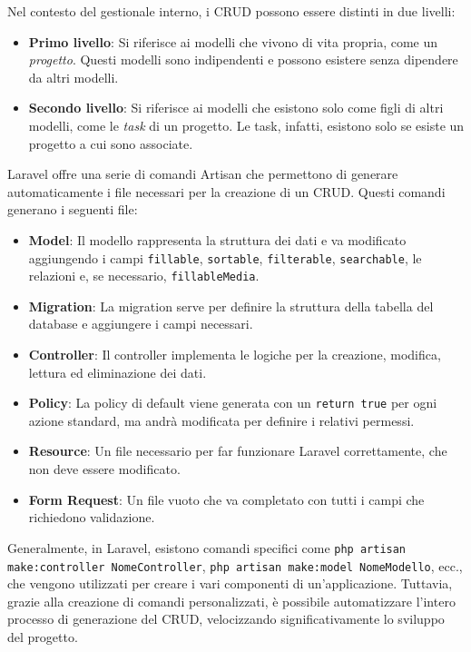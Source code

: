 Nel contesto del gestionale interno, i CRUD possono essere distinti in due livelli:
\begin{itemize}
    \item \textbf{Primo livello}: Si riferisce ai modelli che vivono di vita propria, come un \textit{progetto}. Questi modelli sono indipendenti e possono esistere senza dipendere da altri modelli.
    \item \textbf{Secondo livello}: Si riferisce ai modelli che esistono solo come figli di altri modelli, come le \textit{task} di un progetto. Le task, infatti, esistono solo se esiste un progetto a cui sono associate.
\end{itemize}
Laravel offre una serie di comandi Artisan che permettono di generare automaticamente i file necessari per la creazione di un CRUD. Questi comandi generano i seguenti file:
\begin{itemize}
    \item \textbf{Model}: Il modello rappresenta la struttura dei dati e va modificato aggiungendo i campi \texttt{fillable}, \texttt{sortable}, \texttt{filterable}, \texttt{searchable}, le relazioni e, se necessario, \texttt{fillableMedia}.
    \item \textbf{Migration}: La migration serve per definire la struttura della tabella del database e aggiungere i campi necessari.
    \item \textbf{Controller}: Il controller implementa le logiche per la creazione, modifica, lettura ed eliminazione dei dati.
    \item \textbf{Policy}: La policy di default viene generata con un \texttt{return true} per ogni azione standard, ma andrà modificata per definire i relativi permessi.
    \item \textbf{Resource}: Un file necessario per far funzionare Laravel correttamente, che non deve essere modificato.
    \item \textbf{Form Request}: Un file vuoto che va completato con tutti i campi che richiedono validazione.
\end{itemize}

Generalmente, in Laravel, esistono comandi specifici come \texttt{php artisan make:controller NomeController}, \texttt{php artisan make:model NomeModello}, ecc., che vengono utilizzati per creare i vari componenti di un'applicazione. Tuttavia, grazie alla creazione di comandi personalizzati, è possibile automatizzare l'intero processo di generazione del CRUD, velocizzando significativamente lo sviluppo del progetto. 

